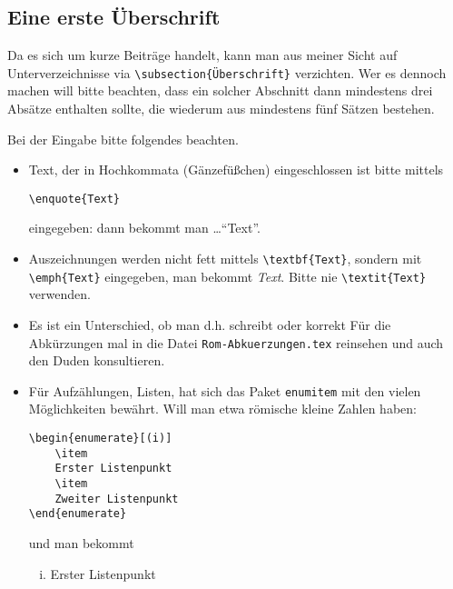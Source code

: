 \begin{refsection}

\section*{Eine erste Überschrift}
% 
Da es sich um kurze Beiträge handelt, kann man aus meiner Sicht auf Unterverzeichnisse via
\verb|\subsection{Überschrift}| verzichten.
Wer es dennoch machen will bitte beachten, dass ein solcher Abschnitt dann mindestens drei Absätze enthalten sollte, die wiederum aus mindestens fünf Sätzen bestehen.

Bei der Eingabe bitte folgendes beachten.

\begin{itemize}[topsep=1em]
\item
Text, der in Hochkommata (Gänzefüßchen) eingeschlossen ist bitte mittels 

\verb|\enquote{Text}|

eingegeben: dann bekommt man \ldots \dh \enquote{Text}.
\item
Auszeichnungen werden nicht fett mittels \verb|\textbf{Text}|, sondern mit \verb|\emph{Text}| eingegeben, \dh man bekommt \emph{Text}.
Bitte nie \verb|\textit{Text}| verwenden.

\item
Es ist ein Unterschied, ob man d.h. schreibt oder korrekt \dh
Für die Abkürzungen mal in die Datei \texttt{Rom-Abkuerzungen.tex} reinsehen und auch den Duden konsultieren.

\item
Für Aufzählungen, \dh Listen, hat sich das Paket \texttt{enumitem} mit den vielen Möglichkeiten bewährt.
Will man etwa römische kleine Zahlen haben: 
\begin{verbatim}
\begin{enumerate}[(i)]
	\item
	Erster Listenpunkt
	\item
	Zweiter Listenpunkt
\end{enumerate}
\end{verbatim}
und man bekommt
\begin{enumerate}[(i), nosep]

	\item
	Erster Listenpunkt


\end{enumerate}
\end{itemize}
\end{refsection}

